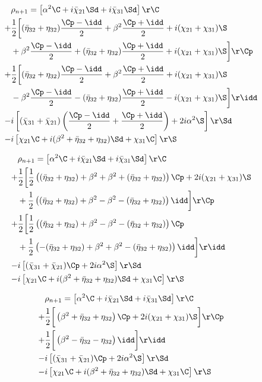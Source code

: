 \begin{imported}
\begin{align}
    &\rho_{n+1} =
    \left[ \a\C + i\chidownone\Sd + i\chidowntwo\Sd \right]\r\C
    \\ +&
    \frac{1}{2}\bigg[(\etadown+\etaup)\frac{\Cp-\idd}{2} + \beta^2\frac{\Cp+\idd}{2} +i(\chiupone+\chiuptwo)\S 
    \\ &+
    \beta^2\frac{\Cp-\idd}{2} + (\etadown+\etaup)\frac{\Cp+\idd}{2} +i(\chiupone+\chiuptwo)\S \bigg]\r\Cp
    \\ +&
    \frac{1}{2}\bigg[(\etadown+\etaup)\frac{\Cp-\idd}{2} + \beta^2\frac{\Cp+\idd}{2} +i(\chiupone+\chiuptwo)\S 
    \\ &-
    \beta^2\frac{\Cp-\idd}{2} - (\etadown+\etaup)\frac{\Cp+\idd}{2} -i(\chiupone+\chiuptwo)\S \bigg]\r\idd
    \\ -&
    i\left[ (\chidowntwo+\chidownone)\left(\frac{\Cp-\idd}{2} + \frac{\Cp+\idd}{2}\right) + 2i\a\S \right]\r\Sd 
    \\ -&
    i\left[ \chiupone\C +i(\beta^2 + \etadown + \etaup)\Sd + \chiuptwo\C \right]\r\S
\end{align}

\begin{align}
    &\rho_{n+1} =
    \left[ \a\C + i\chidownone\Sd + i\chidowntwo\Sd \right]\r\C
    \\ +&
    \frac{1}{2}\bigg[\frac{1}{2}\left((\etadown+\etaup) + \beta^2 + \beta^2 + (\etadown+\etaup)\right)\Cp + 2i(\chiupone+\chiuptwo)\S 
    \\ &+
    \frac{1}{2}\left((\etadown+\etaup) + \beta^2 - \beta^2 - (\etadown+\etaup)\right)\idd \bigg]\r\Cp
    \\ +&
    \frac{1}{2}\bigg[\frac{1}{2}\left((\etadown+\etaup)+\beta^2-\beta^2-(\etadown+\etaup)\right)\Cp
    \\ &+
    \frac{1}{2}\left(-(\etadown+\etaup)+\beta^2+\beta^2-(\etadown+\etaup)\right)\idd  \bigg]\r\idd
    \\ -&
    i\left[ (\chidowntwo+\chidownone)\Cp + 2i\a\S \right]\r\Sd 
    \\ -&
    i\left[ \chiupone\C +i(\beta^2 + \etadown + \etaup)\Sd + \chiuptwo\C \right]\r\S
\end{align}

\begin{align}
    &\rho_{n+1} =
    \left[ \a\C + i\chidownone\Sd + i\chidowntwo\Sd \right]\r\C
    \\ +&
    \frac{1}{2}\bigg[\left(\beta^2 + \etadown+\etaup\right)\Cp + 2i(\chiupone+\chiuptwo)\S 
    \bigg]\r\Cp
    \\ +&
    \frac{1}{2}\bigg[\left(\beta^2-\etadown-\etaup\right)\idd  \bigg]\r\idd
    \\ -&
    i\left[ (\chidowntwo+\chidownone)\Cp + 2i\a\S \right]\r\Sd 
    \\ -&
    i\left[ \chiupone\C +i(\beta^2 + \etadown + \etaup)\Sd + \chiuptwo\C \right]\r\S
\end{align}


\end{imported}
